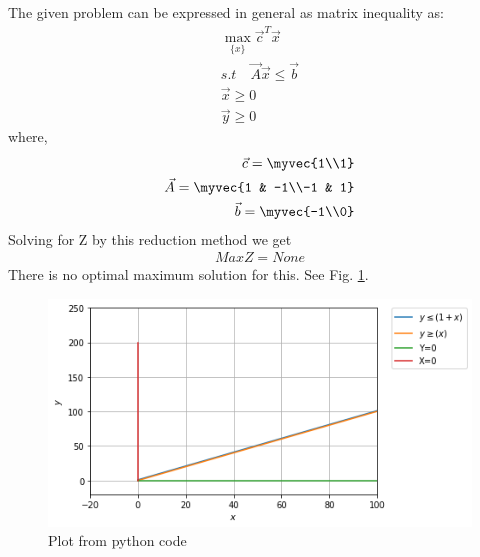 The given problem can be expressed in general
as matrix inequality as:
%
\begin{align}
    \max_{\{x\}}\vec{c}^T\Vec{x}\\
    s.t \quad \Vec{A}\vec{x}\leq \vec{b} \\
    \Vec{x} \geq 0\\
    \Vec{y} \geq 0
\end{align}
where,
\begin{align}
    \Vec{c}=\myvec{1\\1}\\
    \Vec{A}=\myvec{1 & -1\\-1 & 1}\\
    \Vec{b}=\myvec{-1\\0}
\end{align}
Solving for Z by this reduction method we get
\begin{align}
    Max Z = None
\end{align}
There is no optimal maximum solution for this.
%
See Fig. \ref{sep/2/11/fig}.
\begin{figure}[h]
\centering
\includegraphics[width=\columnwidth]{solutions/sep/2/11/Figures/Figure.png}
\caption{Plot from python code }
\label{sep/2/11/fig}
\end{figure}
